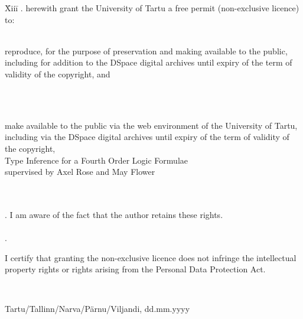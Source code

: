 \documentclass[12pt]{article}
\begin{document}
\begin{tabbing}
\= Xiii\=\kill
{}. \> herewith grant the University of Tartu a free permit (non-exclusive licence) to:\\\\ 

\> 
\begin{minipage}[t]{14.2cm}
reproduce, for the purpose of preservation and making available to the public, including for addition to the DSpace digital archives until expiry of the term of validity of the copyright, and
\end{minipage}
\\\\
\begin{minipage}[t]{14.2cm}
make available to the public via the web environment of the University of Tartu, including via the DSpace digital archives until expiry of the term of validity of the copyright,\\ 

Type Inference for a Fourth Order Logic Formulae\\   

supervised by Axel Rose and May Flower

\end{minipage}\\\\ 
. \>I am aware of the fact that the author retains these rights.\\\\
. \>
\begin{minipage}[t]{14.2cm}
I certify that granting the non-exclusive licence does not infringe the intellectual property rights or rights arising from the Personal Data Protection Act. 
\end{minipage}\\
\end{tabbing}

\noindent
Tartu/Tallinn/Narva/Pärnu/Viljandi, dd.mm.yyyy
\end{document}
